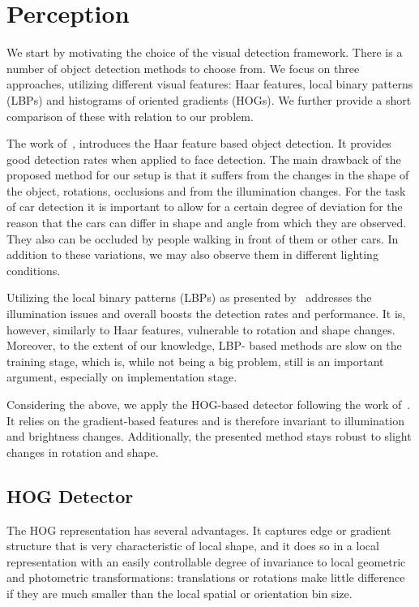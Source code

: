 \section{Perception} %
\label{sec:perception}

We start by motivating the choice of the visual detection framework. There is
a number of object detection methods to choose from. We focus on three
approaches, utilizing different visual features: Haar features, local binary
patterns (LBPs) and histograms of oriented gradients (HOGs). We further
provide a short comparison of these with relation to our problem.

The work of~\citet{violajones2001}, introduces the Haar feature based object
detection. It provides good detection rates when applied to face detection.
The main drawback of the proposed method for our setup is that it suffers from
the changes in the shape of the object, rotations, occlusions and from the
illumination changes. For the task of car detection it is important to allow
for a certain degree of deviation for the reason that the cars can differ in
shape and angle from which they are observed. They also can be occluded by
people walking in front of them or other cars. In addition to these
variations, we may also observe them in different lighting conditions.

Utilizing the local binary patterns (LBPs) as presented by~\citet{lbp2010}
addresses the illumination issues and overall boosts the detection rates and
performance. It is, however, similarly to Haar features, vulnerable to
rotation and shape changes. Moreover, to the extent of our knowledge, LBP-
based methods are slow on the training stage, which is, while not being a big
problem, still is an important argument, especially on implementation stage.

Considering the above, we apply the HOG-based detector following the work
of~\citet{dalal2005}. It relies on the gradient-based features and is
therefore invariant to illumination and brightness changes. Additionally, the
presented method stays robust to slight changes in rotation and shape.

\subsection{HOG Detector}\label{sub:hog_detector}

The HOG representation has several advantages. It captures edge or
gradient structure that is very characteristic of local shape, and it does
so in a local representation with an easily controllable degree of
invariance to local geometric and photometric transformations:
translations or rotations make little difference if they are much smaller
than the local spatial or orientation bin size.

